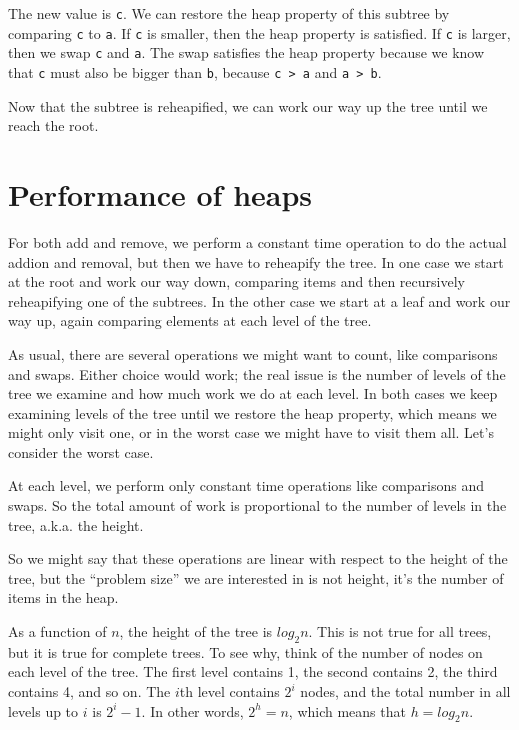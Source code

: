 \documentclass[12pt]{book}
\theoremstyle{exercise}
\begin{document}
The new value is {\tt c}.  We can restore the heap property
of this subtree by comparing {\tt c} to {\tt a}.  
If {\tt c} is smaller, then the heap property is satisfied.
If {\tt c} is larger, then we swap {\tt c} and {\tt a}.  The
swap satisfies the heap property because we know that {\tt c}
must also be bigger than {\tt b}, because {\tt c > a} and
{\tt a > b}.

Now that the subtree is reheapified, we can work our way up
the tree until we reach the root.


\section {Performance of heaps}

For both add and remove, we perform a constant time operation
to do the actual addion and removal, but then we have to
reheapify the tree.  In one case we start at the root and work
our way down, comparing items and then recursively reheapifying
one of the subtrees.  In the other case we start at a leaf and
work our way up, again comparing elements at each level of
the tree.

As usual, there are several operations we might want to count,
like comparisons and swaps.  Either choice would work; the
real issue is the number of levels of the tree we examine
and how much work we do at each level.  In both cases we
keep examining levels of the tree until we restore the heap
property, which means we might only visit one, or in the worst
case we might
have to visit them all.  Let's consider the worst case.

At each level, we perform only constant time operations
like comparisons and swaps.  So the total amount of work is
proportional to the number of levels in the tree, a.k.a.
the height.

So we might say that these operations are linear with respect to
the height of the tree, but the ``problem size'' we are interested
in is not height, it's the number of items in the heap.

As a function of $n$, the height of the tree is $log_2 n$.
This is not true for all trees, but it is true for complete
trees.  To see why, think of the number of nodes on each level
of the tree.  The first level contains 1, the second contains 2,
the third contains 4, and so on.  The $i$th level contains
$2^i$ nodes, and the total number in all levels up to $i$ is
$2^i - 1$.  In other words, $2^h = n$, which means that
$h = log_2 n$.
\end{document}
